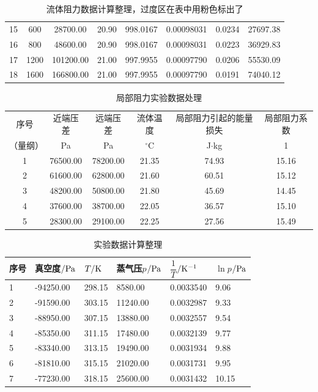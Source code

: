 \documentclass[UTF8,AutoFakeBold,a4paper]{article}
\begin{document}
\begin{table}[h]
\begin{tabular}{cccccccc}
        15 & 600 & 28700.00 & 20.90 & 998.0167 & 0.00098031 & 0.0234 & 27697.38 \\ 
        16 & 800 & 48600.00 & 20.90 & 998.0167 & 0.00098031 & 0.0223 & 36929.83 \\ 
        17 & 1200 & 101200.00 & 21.00 & 997.9955 & 0.00097790 & 0.0206 & 55530.09 \\ 
        18 & 1600 & 166800.00 & 21.00 & 997.9955 & 0.00097790 & 0.0191 & 74040.12 \\ 
        \bottomrule
		\end{tabular}	
		\label{ta1}
		\caption{流体阻力数据计算整理，过度区在表中用\textcolor{mypink}{粉色}标出了}
\end{table}

\begin{table}[h]
		\centering
		\begin{tabular}{cccccc}
		\toprule
		
 序号 & 近端压差 & 远端压差 & 流体温度 & 局部阻力引起的能量损失 & 局部阻力系数 \\ 
  （量纲）&Pa&Pa&$^{\circ}$C&J$\cdot$kg&1\\
 \midrule
		1 & 76500.00 & 78200.00 & 21.35 & 74.93 & 15.16 \\ 
        2 & 61600.00 & 62800.00 & 21.60 & 60.51 & 15.12 \\ 
        3 & 48200.00 & 50800.00 & 21.80 & 45.69 & 14.45 \\ 
        4 & 37600.00 & 38700.00 & 22.05 & 36.57 & 15.10 \\ 
        5 & 28300.00 & 29100.00 & 22.25 & 27.56 & 15.49 \\ 
        \bottomrule
		\end{tabular}	
		\label{ta1}
		\caption{局部阻力实验数据处理}
\end{table}


\setcounter{table}{1}

\begin{table}[h]
		\centering
		\begin{tabular}{p{1cm}<{\centering} p{2.5cm}<{\centering} p{2.5cm}<{\centering} p{2.5cm}<{\centering} p{2.5cm}<{\centering} p{2.5cm}<{\centering}}
		\toprule
		序号 & 真空度$/\rm{Pa}$ & $T/\rm{K}$ & 蒸气压$p$$/\rm{Pa}$ & $\dfrac{1}{T}$$/\rm{K}^{-1}$ &$\ln{p}$$/\rm{Pa}$ \\ 
		\midrule
       1 & -94250.00 & 298.15 & 8580.00 & 0.0033540 & 9.06 \\ 
        2 & -91590.00 & 303.15 & 11240.00 & 0.0032987 & 9.33 \\ 
        3 & -88950.00 & 307.15 & 13880.00 & 0.0032557 & 9.54 \\ 
        4 & -85350.00 & 311.15 & 17480.00 & 0.0032139 & 9.77 \\ 
        5 & -83340.00 & 313.15 & 19490.00 & 0.0031934 & 9.88 \\ 
        6 & -81810.00 & 315.15 & 21020.00 & 0.0031731 & 9.95 \\ 
        7 & -77230.00 & 318.15 & 25600.00 & 0.0031432 & 10.15 \\ 		\bottomrule
		\end{tabular}	
		\label{ta1}
		\caption{实验数据计算整理}
\end{table}
\end{document}
